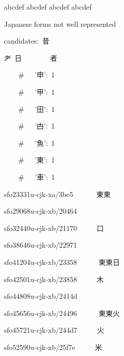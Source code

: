 abc{\mktsFontfileSunexta\color{red}}def
abc{\mktsFontfileSunexta\color{red}}def
abc{\color{red}}def
abcdef




\vspace{\mktsLineheight}\begin{multicols}{2}\raggedcolumns{}



Japanese forms not well represented

\null\par{\mktsTightParagraphs{}

candidates: {\cjk{}昔}\par
{\cjk{}耂} {\cjk{}日}        {\cjk{}者}\par
    \#   '{\cjk{}申}': 1\par
    \#   '{\cjk{}甲}': 1\par
    \#   '{\cjk{}田}': 1\par
    \#   '{\cjk{}甴}': 1\par
    \#   '{\cjk{}魚}': 1\par
    \#   '{\cjk{}東}': 1\par
    \#   '{\cjk{}車}': 1\par
{}\par
sfo23331u-cjk-xa/3be5   {}   {\cnxJzr{}}{\cjk{}東東}\par
sfo29068u-cjk-xb/20464  {}   {\cnxJzr{}}{}\par
sfo32440u-cjk-xb/21170  {}   {\cnxJzr{}}{\cjk{}口{\cnxb{}𣍘}}\par
sfo38646u-cjk-xb/22971  {}   {\cnxJzr{}}{}\par
sfo41204u-cjk-xb/23358  {}   {\cnxJzr{}}{\cnxJzr{}}{\cjk{}東東日}\par
sfo42501u-cjk-xb/23858  {}   {\cnxJzr{}}{\cjk{}木{\cnxb{}𣍘}}\par
sfo44808u-cjk-xb/2414d  {}   {\cnxJzr{}}{}\par
sfo45656u-cjk-xb/24496  {}   {\cnxJzr{}}{\cnxJzr{}}{\cjk{}東東火}\par
sfo45721u-cjk-xb/244d7  {}   {\cnxJzr{}}{\cjk{}火{\cnxb{}𣍘}}\par
sfo52590u-cjk-xb/25f7e  {}   {\cnxJzr{}}{\cjk{}米{\cnxb{}𣍘}}\par
}
\end{multicols}
